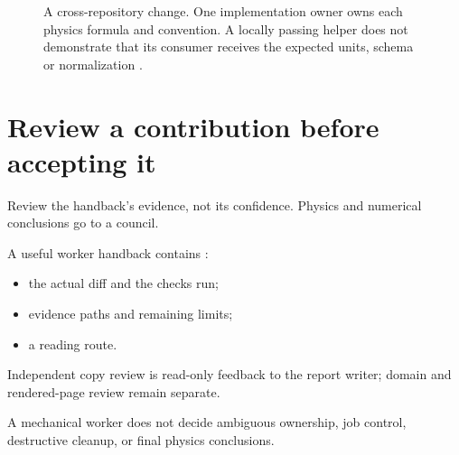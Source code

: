 \begin{figure}[H]
  \centering
  \caption{A cross-repository change. One implementation owner owns each physics formula and
    convention. A locally passing helper does not demonstrate that its consumer receives the
    expected units, schema or normalization \cites[Ownership and framework composition;
      Validation order]{skill:implementation}[Dispatch packet; Review]{skill:delegation}.}
  \label{fig:handoff-layers}
\end{figure}

\section{Review a contribution before accepting it}

\begin{headline}
  Review the handback's evidence, not its confidence. Physics and numerical conclusions go
  to a council.
\end{headline}

A useful worker handback contains \cite[Choosing a role; Review]{skill:delegation}:
\begin{itemize}
  \item the actual diff and the checks run;
  \item evidence paths and remaining limits;
  \item a reading route.
\end{itemize}
Independent copy review is read-only feedback to the report writer; domain and
rendered-page review remain separate.

\begin{rulebox}
  A mechanical worker does not decide ambiguous ownership, job control, destructive cleanup,
  or final physics conclusions.
\end{rulebox}

